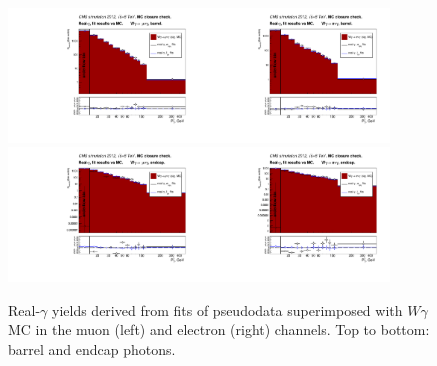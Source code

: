  \begin{figure}[htb]
  \begin{center}
   \includegraphics[width=0.45\textwidth]{../figs/figs_v11/MUON_WGamma/MCclosureWjetsPlusWg/c_TrueDDvsMC_c_MUON_WGamma__UNblind_MCclosure__Barrel__phoEt_MCclosure.pdf}\includegraphics[width=0.45\textwidth]{../figs/figs_v11/ELECTRON_WGamma/MCclosureWjetsPlusWg/c_TrueDDvsMC_c_ELECTRON_WGamma__UNblind_MCclosure__Barrel__phoEt_MCclosure.pdf}
   \includegraphics[width=0.45\textwidth]{../figs/figs_v11/MUON_WGamma/MCclosureWjetsPlusWg/c_TrueDDvsMC_c_MUON_WGamma__UNblind_MCclosure__Endcap__phoEt_MCclosure.pdf}\includegraphics[width=0.45\textwidth]{../figs/figs_v11/ELECTRON_WGamma/MCclosureWjetsPlusWg/c_TrueDDvsMC_c_ELECTRON_WGamma__UNblind_MCclosure__Endcap__phoEt_MCclosure.pdf}
  \caption{Real-$\gamma$ yields derived from fits of pseudodata superimposed with $W\gamma$ MC in the muon (left) and electron (right) channels. Top to bottom: barrel and endcap photons.}
  \label{fig:TrueDDvsMC_MCclosureWjetsPlusWg}
  \end{center}
\end{figure}

